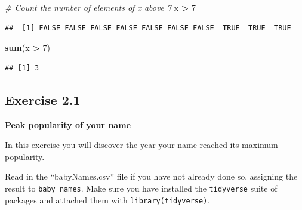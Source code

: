 \documentclass[
]{book}
\newenvironment{Shaded}{\begin{snugshade}}{\end{snugshade}}
\newcommand{\CommentTok}[1]{\textcolor[rgb]{0.56,0.35,0.01}{\textit{#1}}}
\newcommand{\DecValTok}[1]{\textcolor[rgb]{0.00,0.00,0.81}{#1}}
\newcommand{\KeywordTok}[1]{\textcolor[rgb]{0.13,0.29,0.53}{\textbf{#1}}}
\newcommand{\NormalTok}[1]{#1}
\newcommand{\OperatorTok}[1]{\textcolor[rgb]{0.81,0.36,0.00}{\textbf{#1}}}
\newcommand{\StringTok}[1]{\textcolor[rgb]{0.31,0.60,0.02}{#1}}
\begin{document}
\begin{Shaded}
\begin{Highlighting}[]
\CommentTok{\# Count the number of elements of x above 7}
\NormalTok{x }\OperatorTok{\textgreater{}}\StringTok{ }\DecValTok{7}
\end{Highlighting}
\end{Shaded}

\begin{verbatim}
##  [1] FALSE FALSE FALSE FALSE FALSE FALSE FALSE  TRUE  TRUE  TRUE
\end{verbatim}

\begin{Shaded}
\begin{Highlighting}[]
\KeywordTok{sum}\NormalTok{(x }\OperatorTok{\textgreater{}}\StringTok{ }\DecValTok{7}\NormalTok{)}
\end{Highlighting}
\end{Shaded}

\begin{verbatim}
## [1] 3
\end{verbatim}

\hypertarget{exercise-2.1}{%
\subsection{Exercise 2.1}\label{exercise-2.1}}

\textbf{Peak popularity of your name}

In this exercise you will discover the year your name reached its maximum popularity.

Read in the ``babyNames.csv'' file if you have not already done so, assigning the result to \texttt{baby\_names}. Make sure you have installed the \texttt{tidyverse} suite of packages and attached them with \texttt{library(tidyverse)}.
\end{document}
